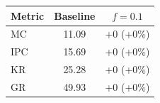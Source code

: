 \begin{tabular}{lcc}
\toprule
Metric & Baseline & $f=0.1$ \\
\midrule
MC & 11.09 & +0 (+0\%) \\
IPC & 15.69 & +0 (+0\%) \\
KR & 25.28 & +0 (+0\%) \\
GR & 49.93 & +0 (+0\%) \\
\bottomrule
\end{tabular}
